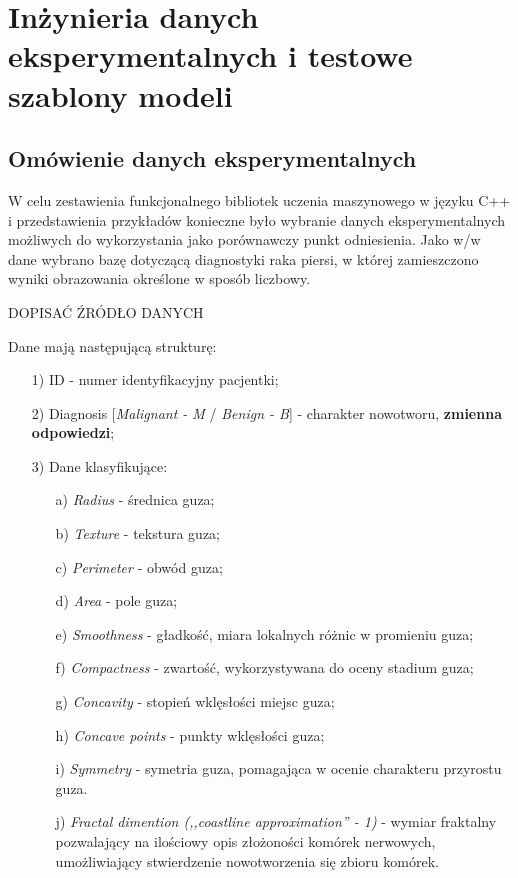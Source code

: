 \chapter{Inżynieria danych eksperymentalnych i testowe szablony modeli}
\section{Omówienie danych eksperymentalnych}
	
	W celu zestawienia funkcjonalnego bibliotek uczenia maszynowego w języku C++ i przedstawienia przykładów konieczne było wybranie danych eksperymentalnych możliwych do wykorzystania jako porównawczy punkt odniesienia. Jako w/w dane wybrano bazę dotyczącą diagnostyki raka piersi, w której zamieszczono wyniki obrazowania określone w sposób liczbowy. 
	
	DOPISAĆ ŹRÓDŁO DANYCH
	
	Dane mają następującą strukturę:
	
	\begin{enumerate}
		\item [1)] ID - numer identyfikacyjny pacjentki;
		\item [2)] Diagnosis [\textit{Malignant - M} / \textit{Benign - B}] - charakter nowotworu, \textbf{zmienna odpowiedzi};
		\item [3)] Dane klasyfikujące:
			\begin{enumerate}
				\item [a)] \textit{Radius} - średnica guza;
				\item [b)] \textit{Texture} - tekstura guza;
				\item [c)] \textit{Perimeter} - obwód guza;
				\item [d)] \textit{Area} - pole guza;
				\item [e)] \textit{Smoothness} - gładkość, miara lokalnych różnic w promieniu guza;
				\item [f)] \textit{Compactness} - zwartość, wykorzystywana do oceny stadium guza;
				\item [g)] \textit{Concavity} - stopień wklęsłości miejsc guza;
				\item [h)] \textit{Concave points} - punkty wklęsłości guza;
				\item [i)] \textit{Symmetry} - symetria guza, pomagająca w ocenie charakteru przyrostu guza.
				\item [j)] \textit{Fractal dimention (,,coastline approximation'' - 1)} - wymiar fraktalny pozwalający na ilościowy opis złożoności komórek nerwowych, umożliwiający stwierdzenie nowotworzenia się zbioru komórek.
			\end{enumerate}
	\end{enumerate}
	
